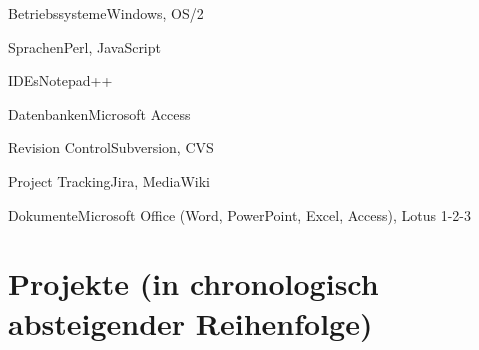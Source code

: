 \documentclass{germanskillsprofile}
\begin{document}
  \begin{sptable}{Betriebssysteme}Windows, OS/2\end{sptable}
  \begin{sptable}{Sprachen}Perl, JavaScript\end{sptable}
  \begin{sptable}{IDEs}Notepad++\end{sptable}
  \begin{sptable}{Datenbanken}Microsoft Access\end{sptable}
  \begin{sptable}{Revision Control}Subversion, CVS\end{sptable}
  \begin{sptable}{Project Tracking}Jira, MediaWiki\end{sptable}
  \begin{sptable}{Dokumente}Microsoft Office (Word, PowerPoint, Excel, Access), Lotus 1-2-3\end{sptable}

\clearpage

\section*{Projekte (in chronologisch absteigender Reihenfolge)}
\end{document}
